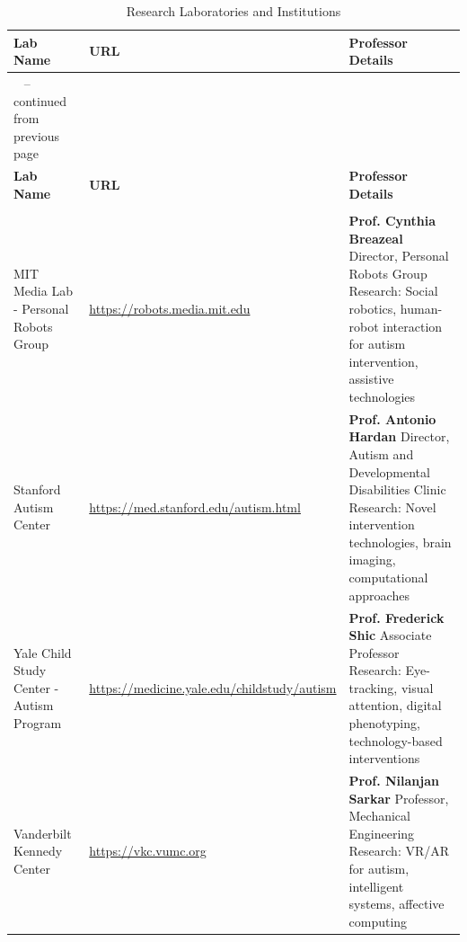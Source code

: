 \documentclass[12pt,a4paper]{article}
\begin{document}
\renewcommand{\arraystretch}{1.4}
\begin{longtable}{|>{\raggedright}p{4.8cm}|>{\raggedright}p{4.2cm}|>{\raggedright\arraybackslash}p{5.5cm}|}
\caption{Research Laboratories and Institutions} \label{tab:research-labs} \\
\hline
\textbf{Lab Name} & \textbf{URL} & \textbf{Professor Details} \\
\hline
\endfirsthead

\multicolumn{3}{c}%
{{\tablename\ \thetable{} -- continued from previous page}} \\
\hline
\textbf{Lab Name} & \textbf{URL} & \textbf{Professor Details} \\
\hline
\endhead

\hline \multicolumn{3}{|r|}{{Continued on next page}} \\ \hline
\endfoot

\hline
\endlastfoot

MIT Media Lab - Personal Robots Group & 
\url{https://robots.media.mit.edu} & 
\textbf{Prof. Cynthia Breazeal}
\newline Director, Personal Robots Group
\newline Research: Social robotics, human-robot interaction for autism intervention, assistive technologies \\
\hline

Stanford Autism Center & 
\url{https://med.stanford.edu/autism.html} & 
\textbf{Prof. Antonio Hardan}
\newline Director, Autism and Developmental Disabilities Clinic
\newline Research: Novel intervention technologies, brain imaging, computational approaches \\
\hline

Yale Child Study Center - Autism Program & 
\url{https://medicine.yale.edu/childstudy/autism} & 
\textbf{Prof. Frederick Shic}
\newline Associate Professor
\newline Research: Eye-tracking, visual attention, digital phenotyping, technology-based interventions \\
\hline

Vanderbilt Kennedy Center & 
\url{https://vkc.vumc.org} & 
\textbf{Prof. Nilanjan Sarkar}
\newline Professor, Mechanical Engineering
\newline Research: VR/AR for autism, intelligent systems, affective computing \\
\hline


\end{longtable}
\end{document}
